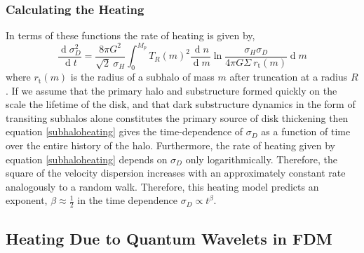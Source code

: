 \documentclass[usenatbib]{mnras}
\renewcommand{\d}[1]{\! \mathrm{d}#1 \:}
\newcommand{\deriv}[2]{\frac{\d{#1}}{\d{#2}}}
\renewcommand{\d}[1]{\ensuremath{\operatorname{d}\!{#1}}}
\begin{document}
\subsubsection{Calculating the Heating}

In terms of these functions the rate of heating is given by,
\begin{equation} \label{subhaloheating}
\deriv{\sigma_D^2}{t} = \frac{8 \pi G^2}{\sqrt{2} \: \sigma_H} \int_0^{M_p} T_R(m)^2  \deriv{n}{m}  \ln{\frac{\sigma_H \sigma_D}{4 \pi G \Sigma \: r_{\text{t}}(m)}} \d{m}
\end{equation}   
where $r_{\text{t}}(m)$ is the radius of a subhalo of mass $m$ after truncation at a radius $R$. 
If we assume that the primary halo and substructure formed quickly on the scale the lifetime of the disk, and that dark substructure dynamics in the form of transiting subhalos alone constitutes the primary source of disk thickening then equation \eqref{subhaloheating} gives the time-dependence of $\sigma_D$ as a function of time over the entire history of the halo. Furthermore, the rate of heating given by equation \eqref{subhaloheating} depends on $\sigma_D$ only logarithmically. Therefore, the square of the velocity dispersion increases with an approximately constant rate analogously to a random walk. Therefore, this heating model predicts an exponent, $\beta \approx \tfrac{1}{2}$ in the time dependence $\sigma_D \propto t^{\beta}$.

\subsection{Heating Due to Quantum Wavelets in FDM}
\end{document}
